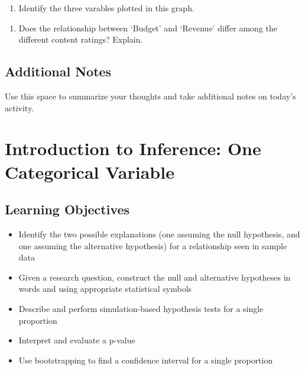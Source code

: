 \documentclass[
]{report}
\providecommand{\tightlist}{%
  \setlength{\itemsep}{0pt}\setlength{\parskip}{0pt}}
\begin{document}
\begin{enumerate}
\def\labelenumi{\arabic{enumi}.}
\setcounter{enumi}{24}
\tightlist
\item
  Identify the three varables plotted in this graph.
\end{enumerate}

\vspace{0.5in}

\begin{enumerate}
\def\labelenumi{\arabic{enumi}.}
\setcounter{enumi}{25}
\tightlist
\item
  Does the relationship between `Budget' and `Revenue' differ among the different content ratings? Explain.
\end{enumerate}

\vspace{1in}

\hypertarget{additional-notes-4}{%
\section{Additional Notes}\label{additional-notes-4}}

Use this space to summarize your thoughts and take additional notes on today's activity.

\hypertarget{introduction-to-inference-one-categorical-variable}{%
\chapter{Introduction to Inference: One Categorical Variable}\label{introduction-to-inference-one-categorical-variable}}

\hypertarget{learning-objectives-2}{%
\section{Learning Objectives}\label{learning-objectives-2}}

\begin{itemize}
\item
  Identify the two possible explanations (one assuming the null hypothesis, and one assuming the alternative hypothesis) for a relationship seen in sample data
\item
  Given a research question, construct the null and alternative hypotheses
  in words and using appropriate statistical symbols
\item
  Describe and perform simulation-based hypothesis tests for a single proportion
\item
  Interpret and evaluate a p-value
\item
  Use bootstrapping to find a confidence interval for a single proportion
\end{itemize}
\end{document}
